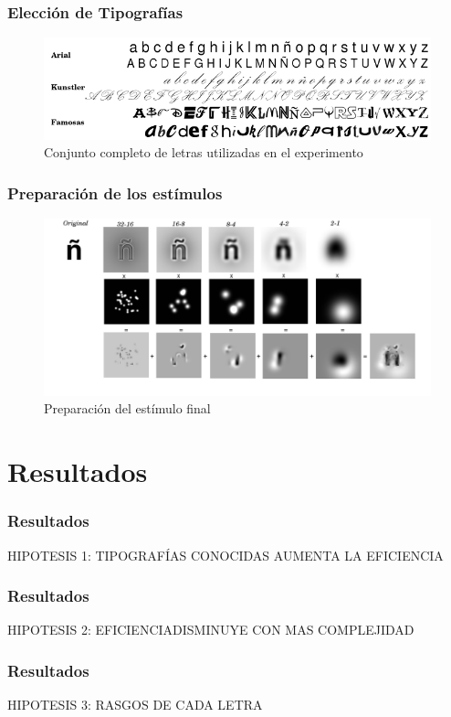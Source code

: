 \documentclass[10pt,presentation]{beamer}
\begin{document}
\begin{frame}
  \frametitle{Elecci\'on de Tipograf\'ias}
    \begin{figure}
    \includegraphics[scale=0.35]{graficos/letras.png}
      \caption{Conjunto completo de letras utilizadas en el experimento}
      \label{figura:conjuntoLetras}
    \end{figure}
\end{frame}

\begin{frame}
  \frametitle{Preparaci\'on de los est\'imulos}
    \begin{figure}
    \includegraphics[scale=0.25]{graficos/estimulofinal.png}
      \caption{Preparación del estímulo final}
      \label{figura:FISET1}
    \end{figure}
\end{frame}


\section{Resultados}
\begin{frame}
  \frametitle{Resultados}
HIPOTESIS 1: TIPOGRAF\'IAS CONOCIDAS AUMENTA LA EFICIENCIA
\end{frame}

\begin{frame}
  \frametitle{Resultados}
HIPOTESIS 2: EFICIENCIADISMINUYE CON MAS COMPLEJIDAD
\end{frame}

\begin{frame}
  \frametitle{Resultados}
HIPOTESIS 3: RASGOS DE CADA LETRA
\end{frame}
\end{document}
